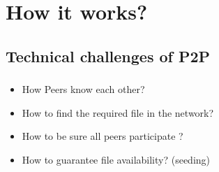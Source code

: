 

% 
\section{How it works?}

  \begin{frame}
  \end{frame}

  \subsection{Technical challenges of P2P}
    \begin{frame}
      \frametitle{\secname}
      \framesubtitle{\subsecname}
      \begin{itemize}
        \item How Peers know each other?
        \item How to find the required file in the network?
        \item How to be sure all peers participate ?
        \item How to guarantee file availability? (seeding)
      \end{itemize}
    \end{frame}

